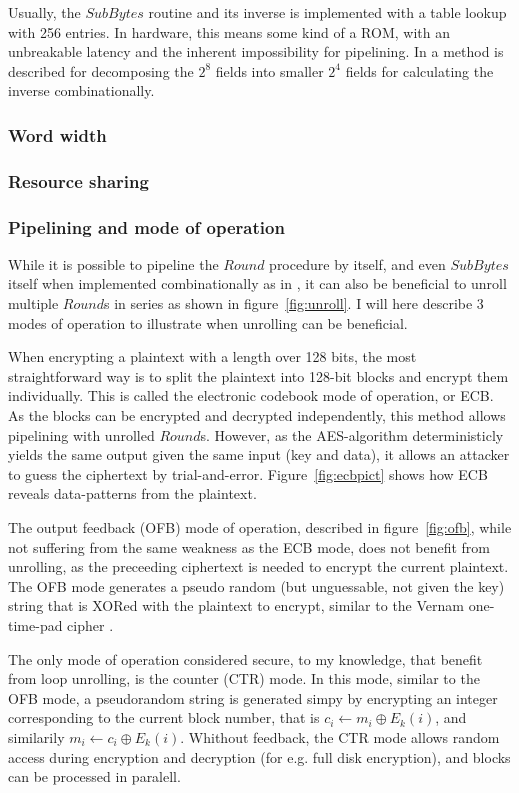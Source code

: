 Usually, the $SubBytes$ routine and its inverse is implemented with a
table lookup with 256 entries. In hardware, this means some kind of a
ROM, with an unbreakable latency and the inherent impossibility for
pipelining. In \cite{csbox} a method is described for decomposing the
$2^8$ fields into smaller $2^4$ fields for calculating the inverse
combinationally.

\subsubsection{Word width}

\subsubsection{Resource sharing}


\subsubsection{Pipelining and mode of operation}

While it is possible to pipeline the $Round$ procedure by itself, and
even $SubBytes$ itself when implemented combinationally as in
\cite{csbox}, it can also be beneficial to unroll multiple $Round$s in
series as shown in figure~\ref{fig:unroll}. I will here describe 3
modes of operation to illustrate when unrolling can be beneficial.

When encrypting a plaintext with a length over 128 bits, the most
straightforward way is to split the plaintext into 128-bit blocks and
encrypt them individually. This is called the electronic codebook mode
of operation, or ECB. As the blocks can be encrypted and decrypted
independently, this method allows pipelining with unrolled
$Round$s. However, as the AES-algorithm deterministicly yields the
same output given the same input (key and data), it allows an attacker
to guess the ciphertext by trial-and-error. Figure~\ref{fig:ecbpict}
shows how ECB reveals data-patterns from the plaintext.

The output feedback (OFB) mode of operation, described in
figure~\ref{fig:ofb}, while not suffering from the same weakness as
the ECB mode, does not benefit from unrolling, as the preceeding
ciphertext is needed to encrypt the current plaintext. The OFB mode
generates a pseudo random (but unguessable, not given the key) string
that is XORed with the plaintext to encrypt, similar to the Vernam
one-time-pad cipher \cite{vernam}.

The only mode of operation considered secure, to my knowledge, that
benefit from loop unrolling, is the counter (CTR) mode. In this mode,
similar to the OFB mode, a pseudorandom string is generated simpy by
encrypting an integer corresponding to the current block number, that
is $c_i \leftarrow m_i \oplus E_k(i)$, and similarily $m_i \leftarrow
c_i \oplus E_k(i)$. Whithout feedback, the CTR mode allows random
access during encryption and decryption (for e.g. full disk
encryption), and blocks can be processed in paralell.

